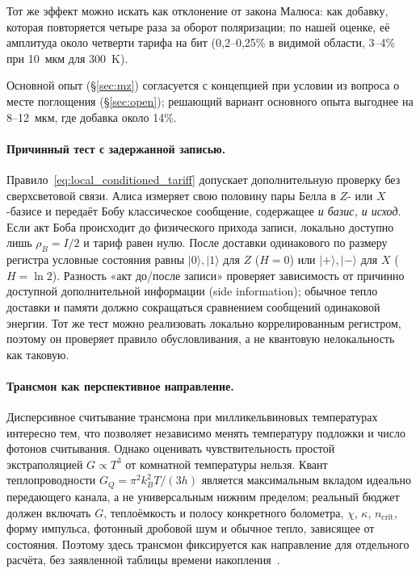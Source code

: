\documentclass[11pt,a4paper]{article}
\newcommand{\Sref}[1]{\hyperref[#1]{\S\ref{#1}}}
\begin{document}
Тот же эффект можно искать как отклонение от закона Малюса: как добавку, которая повторяется четыре раза за оборот поляризации; по нашей оценке, её амплитуда около четверти тарифа на бит (0,2--0,25\% в видимой области, 3--4\% при 10~мкм для 300~K).

Основной опыт (\Sref{sec:mz}) согласуется с концепцией при условии из вопроса о месте поглощения (\Sref{sec:open}); решающий вариант основного опыта выгоднее на 8--12~мкм, где добавка около 14\%.

\paragraph{Причинный тест с задержанной записью.}
Правило~\eqref{eq:local_conditioned_tariff} допускает дополнительную проверку без сверхсветовой связи. Алиса измеряет свою половину пары Белла в $Z$- или $X$-базисе и передаёт Бобу классическое сообщение, содержащее \emph{и базис, и исход}. Если акт Боба происходит до физического прихода записи, локально доступно лишь $\rho_B=I/2$ и тариф равен нулю. После доставки одинакового по размеру регистра условные состояния равны $|0\rangle,|1\rangle$ для $Z$ ($H=0$) или $|+\rangle,|-\rangle$ для $X$ ($H=\ln2$). Разность «акт до/после записи» проверяет зависимость от причинно доступной дополнительной информации (side information); обычное тепло доставки и памяти должно сокращаться сравнением сообщений одинаковой энергии. Тот же тест можно реализовать локально коррелированным регистром, поэтому он проверяет правило обусловливания, а не квантовую нелокальность как таковую.

\paragraph{Трансмон как перспективное направление.}
Дисперсивное считывание трансмона при милликельвиновых температурах интересно тем, что позволяет независимо менять температуру подложки и число фотонов считывания. Однако оценивать чувствительность простой экстраполяцией $G\propto T^3$ от комнатной температуры нельзя. Квант теплопроводности $G_Q=\pi^2k_B^2T/(3h)$ является максимальным вкладом идеально передающего канала, а не универсальным нижним пределом; реальный бюджет должен включать $G$, теплоёмкость и полосу конкретного болометра, $\chi$, $\kappa$, $n_{\mathrm{crit}}$, форму импульса, фотонный дробовой шум и обычное тепло, зависящее от состояния. Поэтому здесь трансмон фиксируется как направление для отдельного расчёта, без заявленной таблицы времени накопления~\cite{schwab2000,gambetta2006}.
\end{document}
